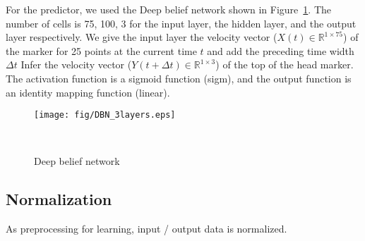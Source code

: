 \documentclass{sigchi}
\begin{document}
For the predictor, we used the Deep belief network shown in Figure~\ref{fig:dbn}. The number of cells is 75, 100, 3 for the input layer, the hidden layer, and the output layer respectively. We give the input layer the velocity vector ($ X (t) \in \mathbb {R}^{1 \times 75} $) of the marker for 25 points at the current time $ t $ and add the preceding time width $ \Delta t $ Infer the velocity vector ($ Y (t + \Delta t) \in \mathbb {R} ^{1 \times 3} $) of the top of the head marker. The activation function is a sigmoid function (sigm), and the output function is an identity mapping function (linear).


\begin{figure}
\centering
  \texttt{[image: fig/DBN\_3layers.eps]}
  \caption{Deep belief network}~\label{fig:dbn}
\end{figure}


\subsection{Normalization}

As preprocessing for learning, input / output data is normalized.
\end{document}
